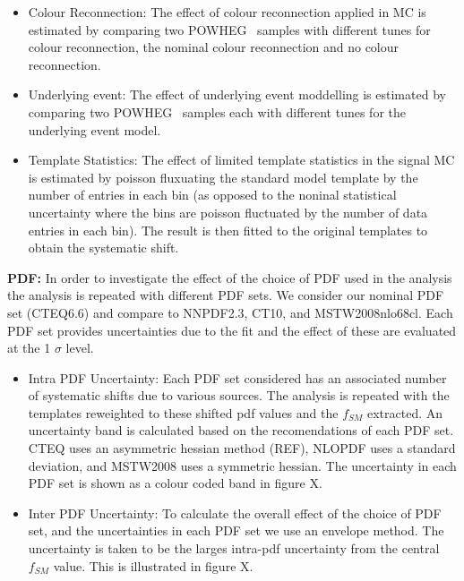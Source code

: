 \begin{itemize}
    \item Colour Reconnection: The effect of colour reconnection applied in MC is estimated by comparing two POWHEG \ttbar\ samples with different tunes for colour reconnection, the nominal colour reconnection and no colour reconnection. 

    \item Underlying event: The effect of underlying event moddelling is estimated by comparing two POWHEG \ttbar\ samples each with different tunes for the underlying event model.

    \item Template Statistics: The effect of limited template statistics in the signal MC is estimated by poisson fluxuating the standard model template by the number of entries in each bin (as opposed to the noninal statistical uncertainty where the bins are poisson fluctuated by the number of data entries in each bin). The result is then fitted to the original templates to obtain the systematic shift. 

\end{itemize}

\vspace{5mm}
\noindent
\textbf{PDF:}
In order to investigate the effect of the choice of PDF used in the analysis the analysis is repeated with different PDF sets. We consider our nominal PDF set (CTEQ6.6) and compare to NNPDF2.3, CT10, and MSTW2008nlo68cl. Each PDF set provides uncertainties due to the fit and the effect of these are evaluated at the 1 $\sigma$ level.
\begin{itemize}
  \item Intra PDF Uncertainty: Each PDF set considered has an associated number of systematic shifts due to various sources. The analysis is repeated with the templates reweighted to these shifted pdf values and the $f_{SM}$ extracted. An uncertainty band is calculated based on the recomendations of each PDF set. CTEQ uses an asymmetric hessian method (REF), NLOPDF uses a standard deviation, and MSTW2008 uses a symmetric hessian. The uncertainty in each PDF set is shown as a colour coded band in figure X.
  \item Inter PDF Uncertainty: To calculate the overall effect of the choice of PDF set, and the uncertainties in each PDF set we use an envelope method. The uncertainty is taken to be the larges intra-pdf uncertainty from the central $f_{SM}$ value. This is illustrated in figure X.
\end{itemize}

